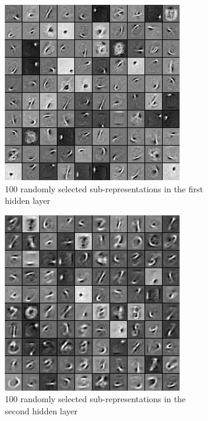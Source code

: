 \documentclass[a4paper,11pt]{report}
\begin{document}
		\begin{figure}[H]
			\begin{center}
				\begin{subfigure}{.7\textwidth}
					\begin{center}
						\includegraphics[width=.6\linewidth]{Images/Experience/3L500_all_layer_0.png}
						\caption{100 randomly selected sub-representations in the first hidden layer}
						\label{fig:500_layer0}
					\end{center}
				\end{subfigure}
				\begin{subfigure}{.7\textwidth}
					\begin{center}
						\includegraphics[width=.6\linewidth]{Images/Experience/3L500_all_layer_1.png}
						\caption{100 randomly selected sub-representations in the second hidden layer}
						\label{fig:500_layer1}
					\end{center}
				\end{subfigure}
				\begin{subfigure}{.7\textwidth}

\end{subfigure}
\end{center}
\end{figure}
\end{document}
